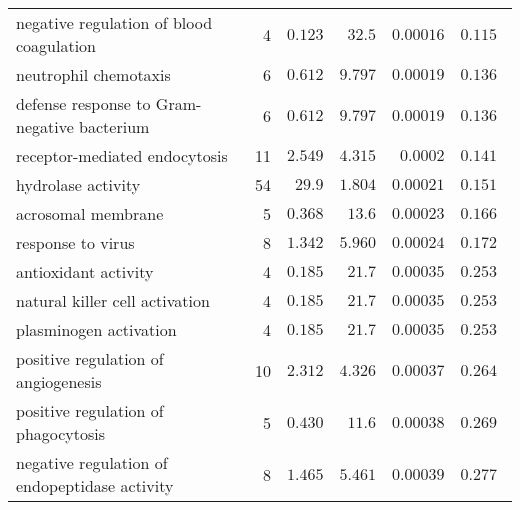 \documentclass{article}
\begin{document}
\begin{longtable}{|l|r|r|r|r|r|}
          negative regulation of blood coagulation &                       4 &                $ 0.123$ &   $  32.5$ &            $0.00016$ &                     $ 0.115~~$ \\
                             neutrophil chemotaxis &                       6 &                $ 0.612$ &   $ 9.797$ &            $0.00019$ &                     $ 0.136~~$ \\
       defense response to Gram-negative bacterium &                       6 &                $ 0.612$ &   $ 9.797$ &            $0.00019$ &                     $ 0.136~~$ \\
                     receptor-mediated endocytosis &                      11 &                $ 2.549$ &   $ 4.315$ &             $0.0002$ &                     $ 0.141~~$ \\
                                hydrolase activity &                      54 &                $  29.9$ &   $ 1.804$ &            $0.00021$ &                     $ 0.151~~$ \\
                                acrosomal membrane &                       5 &                $ 0.368$ &   $  13.6$ &            $0.00023$ &                     $ 0.166~~$ \\
                                 response to virus &                       8 &                $ 1.342$ &   $ 5.960$ &            $0.00024$ &                     $ 0.172~~$ \\
                              antioxidant activity &                       4 &                $ 0.185$ &   $  21.7$ &            $0.00035$ &                     $ 0.253~~$ \\
                    natural killer cell activation &                       4 &                $ 0.185$ &   $  21.7$ &            $0.00035$ &                     $ 0.253~~$ \\
                            plasminogen activation &                       4 &                $ 0.185$ &   $  21.7$ &            $0.00035$ &                     $ 0.253~~$ \\
               positive regulation of angiogenesis &                      10 &                $ 2.312$ &   $ 4.326$ &            $0.00037$ &                     $ 0.264~~$ \\
               positive regulation of phagocytosis &                       5 &                $ 0.430$ &   $  11.6$ &            $0.00038$ &                     $ 0.269~~$ \\
     negative regulation of endopeptidase activity &                       8 &                $ 1.465$ &   $ 5.461$ &            $0.00039$ &                     $ 0.277~~$ \\

\end{longtable}
\end{document}
